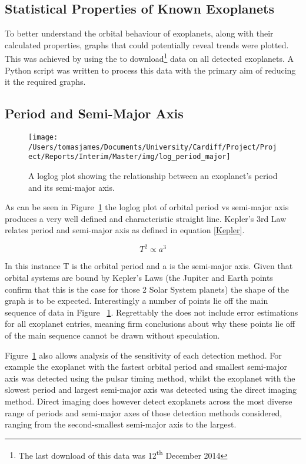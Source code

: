 \documentclass{report}
\begin{document}
\subsection{Statistical Properties of Known Exoplanets}
To better understand the orbital behaviour of exoplanets, along with their calculated properties, graphs that could potentially reveal trends were plotted. This was achieved by using the \textcite{exo} to download\footnote{The last download of this data was 12\textsuperscript{th} December 2014} data on all detected exoplanets. A Python script was written to process this data with the primary aim of reducing it the required graphs.

\subsection*{Period and Semi-Major Axis}
\begin{figure}[H]
\centering
    \texttt{[image: /Users/tomasjames/Documents/University/Cardiff/Project/Project/Reports/Interim/Master/img/log\_period\_major]}
\caption{A loglog plot showing the relationship between an exoplanet's period and its semi-major axis.}\label{log_period_major}
\end{figure}

As can be seen in Figure~\ref{log_period_major} the loglog plot of orbital period vs semi-major axis produces a very well defined and characteristic straight line. Kepler's 3rd Law relates period and semi-major axis as defined in equation \ref{Kepler}.

\begin{equation} \label{Kepler}
    T^{2} \propto a^{3} 
\end{equation}

In this instance T is the orbital period and a is the semi-major axis. Given that orbital systems are bound by Kepler's Laws (the Jupiter and Earth points confirm that this is the case for those 2 Solar System planets) the shape of the graph is to be expected. Interestingly a number of points lie off the main sequence of data in Figure ~\ref{log_period_major}. Regrettably the \textcite{exo} does not include error estimations for all exoplanet entries, meaning firm conclusions about why these points lie off of the main sequence cannot be drawn without speculation.

Figure~\ref{log_period_major} also allows analysis of the sensitivity of each detection method. For example the exoplanet with the fastest orbital period and smallest semi-major axis was detected using the pulsar timing method, whilst the exoplanet with the slowest period and largest semi-major axis was detected using the direct imaging method. Direct imaging does however detect exoplanets across the most diverse range of periods and semi-major axes of those detection methods considered, ranging from the second-smallest semi-major axis to the largest.
\end{document}
